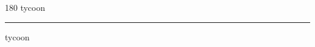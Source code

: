 
\begin{frame}
\begin{center}
\begin{turn}{180}
{\fontsize{2.5cm}{1em}\selectfont tycoon}
\end{turn}
\vspace{1em}\par  
\hrule
\vspace{1em}\par  
{\fontsize{2.5cm}{1em}\selectfont tycoon}
\end{center}
\end{frame}

